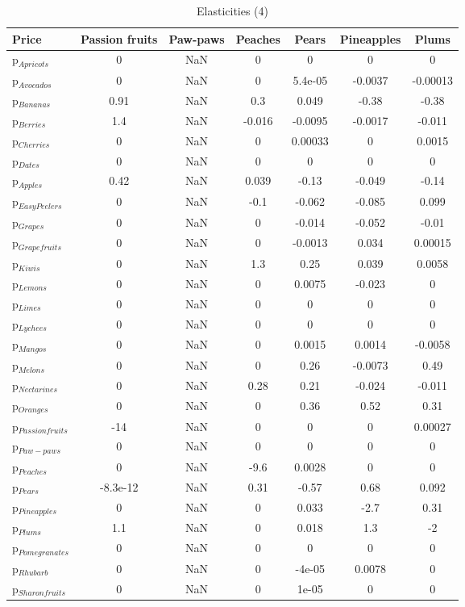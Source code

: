 \documentclass[11pt]{article}
\begin{document}
\begin{table}[h]
\caption{Elasticities (4)}
\label{Table: elasticities 4}
\begin{center}
\begin{tabular}{lcccccc} \hline \hline
Price &Passion fruits &Paw-paws &Peaches &Pears &Pineapples &Plums \\ \hline
p$_{Apricots}$ &0 &NaN &0 &0 &0 &0 \\
p$_{Avocados}$ &0 &NaN &0 &5.4e-05 &-0.0037 &-0.00013 \\
p$_{Bananas}$ &0.91 &NaN &0.3 &0.049 &-0.38 &-0.38 \\
p$_{Berries}$ &1.4 &NaN &-0.016 &-0.0095 &-0.0017 &-0.011 \\
p$_{Cherries}$ &0 &NaN &0 &0.00033 &0 &0.0015 \\
p$_{Dates}$ &0 &NaN &0 &0 &0 &0 \\
p$_{Apples}$ &0.42 &NaN &0.039 &-0.13 &-0.049 &-0.14 \\
p$_{Easy Peelers}$ &0 &NaN &-0.1 &-0.062 &-0.085 &0.099 \\
p$_{Grapes}$ &0 &NaN &0 &-0.014 &-0.052 &-0.01 \\
p$_{Grapefruits}$ &0 &NaN &0 &-0.0013 &0.034 &0.00015 \\
p$_{Kiwis}$ &0 &NaN &1.3 &0.25 &0.039 &0.0058 \\
p$_{Lemons}$ &0 &NaN &0 &0.0075 &-0.023 &0 \\
p$_{Limes}$ &0 &NaN &0 &0 &0 &0 \\
p$_{Lychees}$ &0 &NaN &0 &0 &0 &0 \\
p$_{Mangos}$ &0 &NaN &0 &0.0015 &0.0014 &-0.0058 \\
p$_{Melons}$ &0 &NaN &0 &0.26 &-0.0073 &0.49 \\
p$_{Nectarines}$ &0 &NaN &0.28 &0.21 &-0.024 &-0.011 \\
p$_{Oranges}$ &0 &NaN &0 &0.36 &0.52 &0.31 \\
p$_{Passion fruits}$ &-14 &NaN &0 &0 &0 &0.00027 \\
p$_{Paw-paws}$ &0 &NaN &0 &0 &0 &0 \\
p$_{Peaches}$ &0 &NaN &-9.6 &0.0028 &0 &0 \\
p$_{Pears}$ &-8.3e-12 &NaN &0.31 &-0.57 &0.68 &0.092 \\
p$_{Pineapples}$ &0 &NaN &0 &0.033 &-2.7 &0.31 \\
p$_{Plums}$ &1.1 &NaN &0 &0.018 &1.3 &-2 \\
p$_{Pomegranates}$ &0 &NaN &0 &0 &0 &0 \\
p$_{Rhubarb}$ &0 &NaN &0 &-4e-05 &0.0078 &0 \\
p$_{Sharon fruits}$ &0 &NaN &0 &1e-05 &0 &0 \\
\end{tabular}
\end{center}
\end{table}
\end{document}
